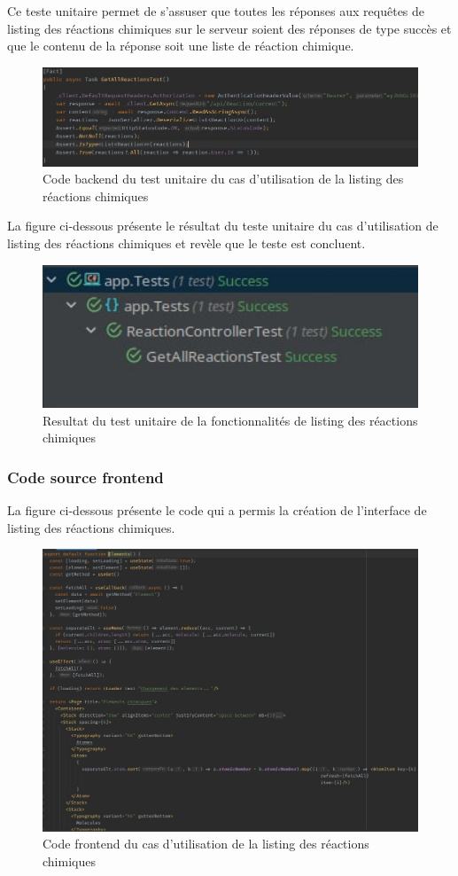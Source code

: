 Ce teste unitaire permet de s'assuser que toutes les réponses aux requêtes de listing des réactions chimiques sur le serveur soient des réponses de type succès et que le contenu de la réponse soit une liste de réaction chimique.

\begin{figure}[H]
	\centering
	\includegraphics[width=1\textwidth]{img/utreaall}
	\caption{Code backend du test unitaire du cas d'utilisation de la listing des réactions chimiques}
\end{figure}

La figure ci-dessous présente le résultat du teste unitaire du cas d'utilisation de listing des réactions chimiques et revèle que le teste est concluent.

\begin{figure}[H]
	\centering
	\includegraphics[width=1\textwidth]{img/utrcr}
	\caption{Resultat du test unitaire de la fonctionnalités de listing des réactions chimiques}
\end{figure}

\subsubsection{Code source frontend}

La figure ci-dessous présente le code qui a permis la création de l'interface de listing des réactions chimiques.

\begin{figure}[H]
	\centering
	\includegraphics[width=1\textwidth]{img/frl}
	\caption{Code frontend du cas d'utilisation de la listing des réactions chimiques}
\end{figure}